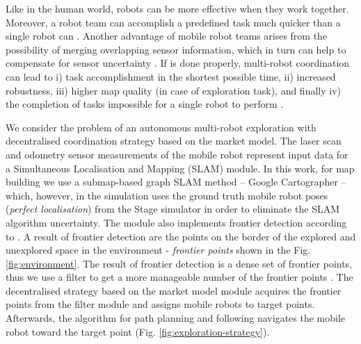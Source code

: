 \documentclass[letterpaper, 10 pt, conference]{ieeeconf}  %
\begin{document}
 Like in the human world, robots can be more effective when they work together. Moreover, a robot team can accomplish a predefined task much quicker than a single robot can \cite{free-market}. Another advantage of mobile robot teams arises from the possibility of merging overlapping sensor information, which in turn can help to compensate for sensor uncertainty \cite{segmentation}.
If is done properly, multi-robot coordination can lead to i) task accomplishment in the shortest possible time, ii) increased robustness, iii) higher map quality (in case of exploration task), and finally iv) the completion of tasks impossible for a single robot to perform \cite{survey-analysis}.

We consider the problem of an autonomous multi-robot exploration with decentralised coordination strategy based on the market model. The laser scan and odometry sensor measurements of the mobile robot represent input data for a Simultaneous Localisation and Mapping (SLAM) module. In this work, for map building we use a submap-based graph SLAM method -- Google Cartographer \cite{cartographer} -- which, however, in the simulation uses the ground truth mobile robot poses (\textit {perfect localisation}) from the Stage simulator \cite{Stage} in order to eliminate the SLAM algorithm uncertainty. The module also implements frontier detection according to \cite{juraj}. A result of frontier detection are the points on the border of the explored and unexplored space in the environment - \textit{frontier points} shown in the Fig. \ref{fig:environment}. The result of frontier detection is a dense set of frontier points, thus we use a filter to get a more manageable number of the frontier points \cite{Umari}. The decentralised strategy based on the market model module acquires the frontier points from the filter module and assigns mobile robots to target points. Afterwards, the algorithm for path planning and following navigates the mobile robot toward the target point (Fig. \ref{fig:exploration-strategy}).      
\end{document}
